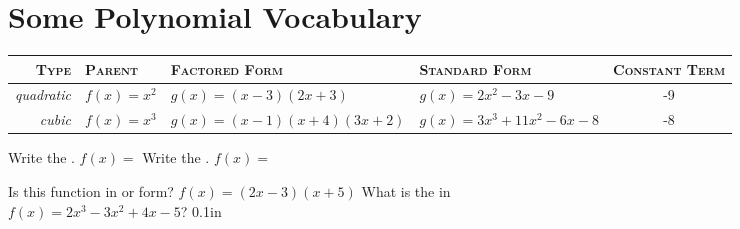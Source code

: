 \section{Some Polynomial Vocabulary}

\begin{center}
    \small
    \begin{tabular}{r@{\hskip 1em}l@{\hskip 2em}l@{\hskip 2em}l@{\hskip 1em}c}
        \toprule 
        {\scshape Type} & {\scshape Parent} & {\scshape Factored Form} & {\scshape Standard Form} & {\scshape  Constant Term} \\
        \midrule 
        {\itshape quadratic} 
            & $f(x) = x^2$ 
            & $g(x)=(x-3)(2x+3) $
            & $g(x) = 2x^2 -3x - 9$ 
            & -9\\
        {\itshape cubic} 
            & $f(x) = x^3$ 
            & $g(x)=(x-1)(x+4)(3x+2) $
            & $g(x) = 3x^3 + 11x^2  - 6x - 8$ 
            & -8\\
        \bottomrule
    \end{tabular}
\end{center}

\myProblemsWithContent
{
    Write the .
    \tcblower
    $f(x) = $ 
}
{
    Write the .
    \tcblower
    $f(x) = $ 
}

\myProblems
{
    Is this function in  or  form?
    $f(x) = (2x-3)(x+5)$
}
{
    What is the  in \\$f(x) = 2x^3 -3x^2 + 4x -5$?
}
{0.1in}